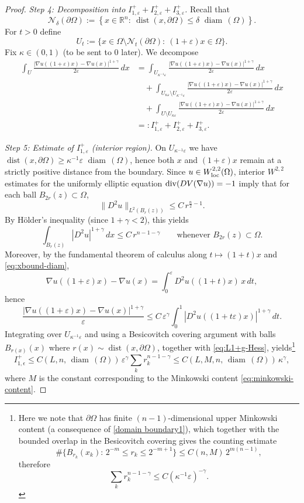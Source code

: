 \documentclass[reqno,11pt]{amsart}
\def\dist{{\mathop\mathrm{dist}}}
\def\ez{\epsilon}
\def\diam{{\mathop\mathrm{\,diam\,}}}
\numberwithin{equation}{section}
\theoremstyle{remark}
\begin{document}
\begin{proof}
\medskip
\noindent\textit{Step 4: Decomposition into $I_{1,\varepsilon}^++I_{2,\varepsilon}^++I_{3,\varepsilon}^+$.}
Recall that
\[
\mathcal N_{\delta}(\partial \Omega):=\left\{ x\in \mathbb R^n:\ \dist(x,\partial \Omega)\le \delta\,\diam(\Omega) \right\}.
\]
For $t>0$ define
\[
U_t:=\Big\{x\in \Omega\setminus \mathcal N_{t}(\partial\Omega):\ (1+\varepsilon)x\in\Omega\Big\}.
\]
Fix $\kappa\in(0,1)$ (to be sent to $0$ later). We decompose
\begin{align*}
\int_U \frac{|\nabla u((1+\varepsilon)x)-\nabla u(x)|^{1+\gamma}}{2\varepsilon}\,dx
&=\int_{U_{\kappa^{-1}\varepsilon}} \frac{|\nabla u((1+\varepsilon)x)-\nabla u(x)|^{1+\gamma}}{2\varepsilon}\,dx\\
&\quad +\int_{U_{\kappa\varepsilon}\setminus U_{\kappa^{-1}\varepsilon}} \frac{|\nabla u((1+\varepsilon)x)-\nabla u(x)|^{1+\gamma}}{2\varepsilon}\,dx\\
&\quad +\int_{U\setminus U_{\kappa\varepsilon}} \frac{|\nabla u((1+\varepsilon)x)-\nabla u(x)|^{1+\gamma}}{2\varepsilon}\,dx\\
&=: I_{1,\varepsilon}^+ + I_{2,\varepsilon}^+ + I_{3,\varepsilon}^+.
\end{align*}

\medskip
\noindent\textit{Step 5: Estimate of $I_{1,\varepsilon}^+$ (interior region).}
On $U_{\kappa^{-1}\varepsilon}$ we have $\dist(x,\partial\Omega)\ge \kappa^{-1}\varepsilon\,\diam(\Omega)$, hence both $x$ and $(1+\varepsilon)x$ {remain at a strictly positive distance from the boundary}.
Since $u\in W^{2,2}_{\rm loc}(\Omega)$, interior $W^{2,2}$ estimates for the uniformly elliptic equation
${\rm div}(DV(\nabla u))=-1$ imply that for each ball $B_{2r}(z)\subset\Omega$,
\[
\|D^2u\|_{L^2(B_r(z))}\le C\,r^{\frac n2-1}.
\]
By H\"older's inequality (since $1+\gamma<2$), this yields
\begin{equation}\label{eq:L1+g-Hess}
\int_{B_r(z)} |D^2u|^{1+\gamma}\,dx \le C\,r^{n-1-\gamma}\qquad\text{whenever }B_{2r}(z)\subset\Omega.
\end{equation}
Moreover, by the fundamental theorem of calculus along $t\mapsto (1+t)x$ and \eqref{eq:xbound-diam},
\[
\nabla u((1+\varepsilon)x)-\nabla u(x)=\int_0^\varepsilon D^2u((1+t)x)\,x\,dt,
\]
hence
\[
\frac{|\nabla u((1+\varepsilon)x)-\nabla u(x)|^{1+\gamma}}{\varepsilon}
\le C\,\varepsilon^\gamma\int_0^1 |D^2u((1+t\varepsilon)x)|^{1+\gamma}\,dt.
\]
Integrating over $U_{\kappa^{-1}\varepsilon}$ and using a Besicovitch covering argument with balls
$B_{r(x)}(x)$ where $r(x)\sim \dist(x,\partial\Omega)$, together with \eqref{eq:L1+g-Hess}, yields\footnote{Here we note that $\partial\Omega$ has finite $(n{-}1)$-dimensional upper Minkowski content (a consequence of
	\eqref{domain boundary1}), {which together with the bounded overlap in the Besicovitch covering gives the counting estimate}
	\[
	{\#\{B_{r_k}(x_k):\,2^{-m}\le r_k\le 2^{-m+1}\}\le C(n,M)\,2^{m(n-1)},}
	\] 
	{therefore}
	$$
	{\sum_k r_k^{n-1-\gamma} \leq C (\kappa^{-1}\varepsilon)^{-\gamma}.}
	$$
} 
\[
I_{1,\ez}^+ \le C(L,n,\diam(\Omega))\,\varepsilon^\gamma \sum_k r_k^{n-1-\gamma}
\le C(L,M,n,\diam(\Omega))\,\kappa^\gamma{,}
\]
{where $M$ is the constant corresponding to the Minkowski content \eqref{eq:minkowski-content}.} 


\end{proof}
\end{document}
